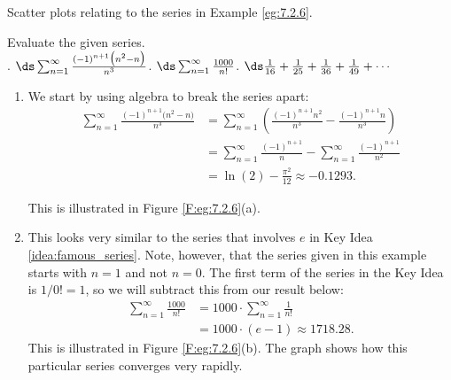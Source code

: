\begin{marginfigure}[4cm] %
\caption{Scatter plots relating to the series in Example \ref{eg:7.2.6}.} \label{F:eg:7.2.6}
\end{marginfigure}

\begin{example} \label{eg:7.2.6} %
Evaluate the given series.\\

. $\ds\sum_{n=1}^\infty \frac{(-1)^{n+1}\big(n^2-n\big)}{n^3}$. $\ds\sum_{n=1}^\infty \frac{1000}{n!}$. $\ds \frac1{16}+\frac1{25}+\frac1{36}+\frac1{49}+\cdots$

\solution
\begin{enumerate}
\item	We start by using algebra to break the series apart:
\begin{align*}
\sum_{n=1}^\infty \frac{(-1)^{n+1}\big(n^2-n\big)}{n^3} &= \sum_{n=1}^\infty\left(\frac{(-1)^{n+1}n^2}{n^3}-\frac{(-1)^{n+1}n}{n^3}\right) \\
						&= \sum_{n=1}^\infty\frac{(-1)^{n+1}}{n}-\sum_{n=1}^\infty\frac{(-1)^{n+1}}{n^2} \\
						&= \ln(2) - \frac{\pi^2}{12}	\approx	-0.1293.
\end{align*}

This is illustrated in Figure \ref{F:eg:7.2.6}(a).

\item		This looks very similar to the series that involves $e$ in Key Idea \ref{idea:famous_series}. Note, however, that the series given in this example starts with $n=1$ and not $n=0$. The first term of the series in the Key Idea is $1/0! = 1$, so we will subtract this from our result below:
\begin{align*}
		\sum_{n=1}^\infty \frac{1000}{n!} &= 1000\cdot\sum_{n=1}^\infty \frac{1}{n!} \\
							&= 1000\cdot (e-1) \approx  1718.28.
\end{align*}
This is illustrated in Figure \ref{F:eg:7.2.6}(b). The graph shows how this particular series converges very rapidly.



\end{enumerate}
\end{example}
